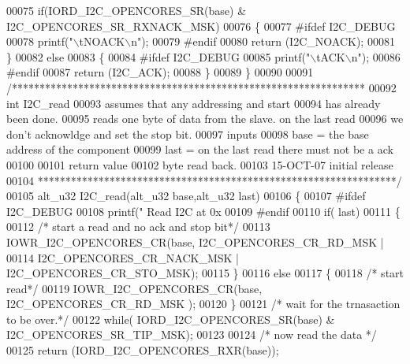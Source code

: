 \begin{DoxyCode}
{{00075    \textcolor{keywordflow}{if}(IORD_I2C_OPENCORES_SR(base) & I2C_OPENCORES_SR_RXNACK_MSK)
00076    \{
00077 \textcolor{preprocessor}{#ifdef  I2C\_DEBUG}
00078         printf(\textcolor{stringliteral}{"\(\backslash\)tNOACK\(\backslash\)n"});
00079 \textcolor{preprocessor}{#endif}
00080         \textcolor{keywordflow}{return} (I2C_NOACK);
00081    \}
00082    \textcolor{keywordflow}{else}
00083    \{
00084 \textcolor{preprocessor}{#ifdef  I2C\_DEBUG}
00085         printf(\textcolor{stringliteral}{"\(\backslash\)tACK\(\backslash\)n"});
00086 \textcolor{preprocessor}{#endif}
00087        \textcolor{keywordflow}{return} (I2C_ACK);
00088    \}
00089 \}
00090 
00091 \textcolor{comment}{/****************************************************************}
00092 \textcolor{comment}{int I2C\_read}
00093 \textcolor{comment}{            assumes that any addressing and start}
00094 \textcolor{comment}{            has already been done.}
00095 \textcolor{comment}{            reads one byte of data from the slave.  on the last read}
00096 \textcolor{comment}{            we don't acknowldge and set the stop bit.}
00097 \textcolor{comment}{inputs}
00098 \textcolor{comment}{      base = the base address of the component}
00099 \textcolor{comment}{      last = on the last read there must not be a ack}
00100 \textcolor{comment}{}
00101 \textcolor{comment}{return value}
00102 \textcolor{comment}{       byte read back.}
00103 \textcolor{comment}{15-OCT-07 initial release}
00104 \textcolor{comment}{*****************************************************************/}
00105 alt_u32 I2C_read(alt_u32 base,alt_u32 last)
00106 \{
00107 \textcolor{preprocessor}{#ifdef  I2C\_DEBUG}
00108         printf(\textcolor{stringliteral}{" Read I2C at 0x%
00109 \textcolor{preprocessor}{#endif}
00110   \textcolor{keywordflow}{if}( last)
00111   \{
00112                \textcolor{comment}{/* start a read and no ack and stop bit*/}
00113            IOWR_I2C_OPENCORES_CR(base, I2C_OPENCORES_CR_RD_MSK |
00114                I2C_OPENCORES_CR_NACK_MSK | I2C_OPENCORES_CR_STO_MSK);
00115   \}
00116   \textcolor{keywordflow}{else}
00117   \{
00118           \textcolor{comment}{/* start read*/}
00119           IOWR_I2C_OPENCORES_CR(base, I2C_OPENCORES_CR_RD_MSK );
00120   \}
00121           \textcolor{comment}{/* wait for the trnasaction to be over.*/}
00122   \textcolor{keywordflow}{while}( IORD_I2C_OPENCORES_SR(base) & I2C_OPENCORES_SR_TIP_MSK);
00123 
00124          \textcolor{comment}{/* now read the data */}
00125         \textcolor{keywordflow}{return} (IORD_I2C_OPENCORES_RXR(base));
}}}
\end{DoxyCode}
